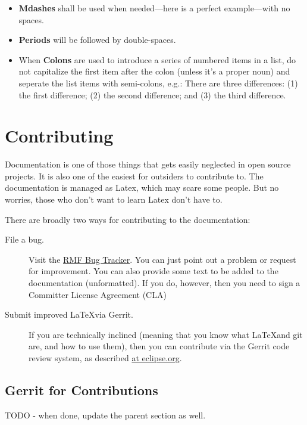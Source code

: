 \begin{itemize}

\item
  \textbf{Mdashes} shall be used when needed—here is a perfect example—with no spaces.  
\item
  \textbf{Periods} will be followed by double-spaces.
\item
  When \textbf{Colons} are used to introduce a series of numbered items in a list, do not capitalize the first item after the colon (unless it's a proper noun) and seperate the list items with semi-colons, e.g.:
  There are three differences: (1) the first difference; (2) the second difference; and (3) the third difference.
  
\end{itemize}

\section{Contributing}

Documentation is one of those things that gets easily neglected in open source projects.  It is also one of the easiest for outsiders to contribute to.  The documentation is managed as Latex, which may scare some people.  But no worries, those who don't want to learn Latex don't have to.

There are broadly two ways for contributing to the documentation:

\begin{description}
  \item[File a bug.]  Visit the \href{https://bugs.eclipse.org/bugs/enter_bug.cgi?assigned_to=&blocked=&bug_severity=normal&bug_status=NEW&comment=&contenttypeentry=&contenttypemethod=autodetect&data=&dependson=&description=&flag_type-1=X&flag_type-11=X&flag_type-12=X&flag_type-2=X&flag_type-4=X&flag_type-6=X&flag_type-7=X&flag_type-8=X&form_name=enter_bug&keywords=&&op_sys=All&product=MDT.RMF&qa_contact=&rep_platform=All&short_desc=&version=unspecified}{RMF Bug Tracker}.  You can just point out a problem or request for improvement.  You can also provide some text to be added to the documentation (unformatted).  If you do, however, then you need to sign a Committer License Agreement (CLA)
  \item[Submit improved \LaTeX via Gerrit.]  If you are technically inclined (meaning that you know what \LaTeX and git are, and how to use them), then you can contribute via the Gerrit code review system, as described \href{https://wiki.eclipse.org/Gerrit}{at eclipse.org}.
\end{description}

\subsection{Gerrit for Contributions}

TODO - when done, update the parent section as well.


